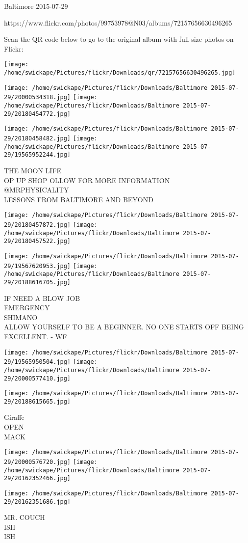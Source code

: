 \documentclass[10pt,letterpaper]{article}
\begin{document}
Baltimore 2015-07-29

https://www.flickr.com/photos/99753978@N03/albums/72157656630496265

Scan the QR code below to go to the original album with full-size photos on Flickr:

\texttt{[image: /home/swickape/Pictures/flickr/Downloads/qr/72157656630496265.jpg]}
\pagebreak

\texttt{[image: /home/swickape/Pictures/flickr/Downloads/Baltimore 2015-07-29/20000534318.jpg]}
\texttt{[image: /home/swickape/Pictures/flickr/Downloads/Baltimore 2015-07-29/20180454772.jpg]}

\texttt{[image: /home/swickape/Pictures/flickr/Downloads/Baltimore 2015-07-29/20180458482.jpg]}
\texttt{[image: /home/swickape/Pictures/flickr/Downloads/Baltimore 2015-07-29/19565952244.jpg]}

THE MOON LIFE\\
OP UP SHOP OLLOW FOR MORE INFORMATION\\
@MRPHYSICALITY\\
LESSONS FROM BALTIMORE AND BEYOND
\pagebreak

\texttt{[image: /home/swickape/Pictures/flickr/Downloads/Baltimore 2015-07-29/20180457872.jpg]}
\texttt{[image: /home/swickape/Pictures/flickr/Downloads/Baltimore 2015-07-29/20180457522.jpg]}

\texttt{[image: /home/swickape/Pictures/flickr/Downloads/Baltimore 2015-07-29/19567620953.jpg]}
\texttt{[image: /home/swickape/Pictures/flickr/Downloads/Baltimore 2015-07-29/20188616705.jpg]}

IF NEED A BLOW JOB\\
EMERGENCY\\
SHIMANO\\
ALLOW YOURSELF TO BE A BEGINNER.  NO ONE STARTS OFF BEING EXCELLENT.  {-} WF
\pagebreak

\texttt{[image: /home/swickape/Pictures/flickr/Downloads/Baltimore 2015-07-29/19565950504.jpg]}
\texttt{[image: /home/swickape/Pictures/flickr/Downloads/Baltimore 2015-07-29/20000577410.jpg]}

\vspace{0.25in}
\texttt{[image: /home/swickape/Pictures/flickr/Downloads/Baltimore 2015-07-29/20188615665.jpg]}

Giraffe\\
OPEN\\
MACK
\pagebreak

\texttt{[image: /home/swickape/Pictures/flickr/Downloads/Baltimore 2015-07-29/20000576720.jpg]}
\texttt{[image: /home/swickape/Pictures/flickr/Downloads/Baltimore 2015-07-29/20162352466.jpg]}

\texttt{[image: /home/swickape/Pictures/flickr/Downloads/Baltimore 2015-07-29/20162351686.jpg]}

MR. COUCH\\
ISH\\
ISH
\pagebreak
\end{document}
